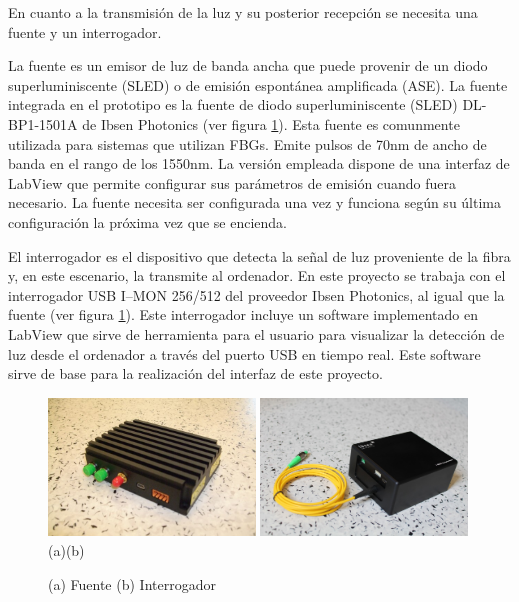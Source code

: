 En cuanto a la transmisión de la luz y su posterior recepción se necesita una fuente y un interrogador. 

La fuente es un emisor de luz de banda ancha que puede provenir de un diodo superluminiscente (SLED) o de emisión espontánea amplificada (ASE).  La fuente integrada en el prototipo es la fuente de diodo superluminiscente (SLED) DL-BP1-1501A de Ibsen Photonics (ver figura \ref{fig:FuenteInterrogador}). Esta fuente es comunmente utilizada para sistemas que utilizan FBGs. Emite pulsos de 70nm de ancho de banda en el rango de los 1550nm. La versión empleada dispone de una interfaz de LabView que permite configurar sus parámetros de emisión cuando fuera necesario. La fuente necesita ser configurada una vez y funciona según su última configuración la próxima vez que se encienda. 

El interrogador es el dispositivo que detecta la señal de luz proveniente de la fibra y, en este escenario, la transmite al ordenador. En este proyecto se trabaja con el interrogador USB I–MON 256/512 del proveedor Ibsen Photonics, al igual que la fuente (ver figura \ref{fig:FuenteInterrogador}). Este interrogador incluye un software implementado en LabView que sirve de herramienta para el usuario para visualizar la detección de luz desde el ordenador a través del puerto USB en tiempo real.  Este software sirve de base para la realización del interfaz de este proyecto. 

\begin{figure}[H]
	\centering
	\includegraphics[width=0.49\textwidth]{./img/fuente}
	\includegraphics[width=0.49\textwidth]{./img/interrogador} 
	\\(a)\hspace{7cm}(b)
	\caption{(a) Fuente \cite{fuente} (b) Interrogador \cite{interrogador}} 
	\label{fig:FuenteInterrogador}
\end{figure}



